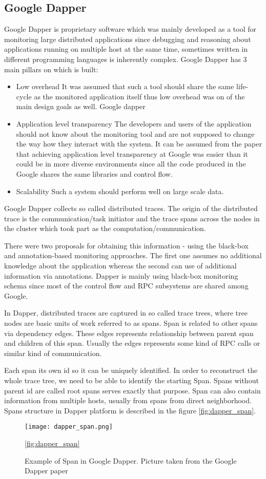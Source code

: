 \subsection{Google Dapper}
Google Dapper is proprietary software which was mainly developed as a tool for monitoring large distributed applications since debugging and reasoning about applications running on multiple host at the same time, sometimes written in different programming languages is inherently complex. Google Dapper has 3 main pillars on which is built:
\begin{itemize}
	\item Low overhead
	It was assumed that such a tool should share the same life-cycle as the monitored application itself thus low overhead was on of the main design goals as well. Google dapper 
	\item Application level transparency
	The developers and users of the application should not know about the monitoring tool and are not supposed to change the way how they interact with the system. It can be assumed from the paper that achieving application level transparency at Google was easier than it could be in more diverse environments since all the code produced in the Google shares the same libraries and control flow.
	\item Scalability
	Such a system should perform well on large scale data.
\end{itemize}	
Google Dapper collects so called distributed traces. The origin of the distributed trace is the communication/task initiator and the trace spans across the nodes in the cluster which took part as the computation/communication.
	
There were two proposals for obtaining this information - using the black-box and annotation-based monitoring approaches. The first one assumes no additional knowledge about the application whereas the second can use of additional information via annotations. Dapper is mainly using black-box monitoring schema since most of the control flow and RPC subsystems are shared among Google.
	
In Dapper, distributed traces are captured in so called trace trees, where tree nodes are basic units of work referred to as spans. Span is related to other spans via dependency edges. These edges represents relationship between parent span and children of this span. Usually the edges represents some kind of RPC calls or similar kind of communication.

Each span its own id so it can be uniquely identified. In order to reconstruct the whole trace tree, we need to be able to identify the starting Span. Spans without parent id are called root spans serves exactly that purpose. Span can also contain information from multiple hosts, usually from spans from direct neighborhood. Spans structure in Dapper platform is described in the figure \ref{fig:dapper_span}.
\begin{figure}
	\centering
		\texttt{[image: dapper\_span.png]}
	\caption{Example of Span in Google Dapper. Picture taken from the Google Dapper paper}
	\ref{fig:dapper_span}
\end{figure}


